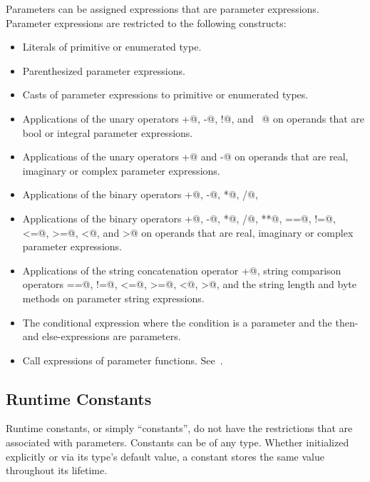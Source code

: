 Parameters can be assigned expressions that are parameter expressions.
Parameter expressions are restricted to the following constructs:
\begin{itemize}
\item
 Literals of primitive or enumerated type.
\item
 Parenthesized parameter expressions.
\item
 Casts of parameter expressions to primitive or enumerated types.
\item
 Applications of the unary operators \verb@+@, \verb@-@, \verb@!@,
 and \verb@~@ on operands that are bool or integral parameter
 expressions.
\item
 Applications of the unary operators \verb@+@ and \verb@-@ on operands that are
 real, imaginary or complex parameter
 expressions.
\item
 Applications of the binary operators \verb@+@, \verb@-@, \verb@*@, \verb@/@, \verb@%@, \verb@**@, \verb@&&@, \verb@||@, \verb@&@, \verb@|@, \verb@^@, \verb@<<@, \verb@>>@, \verb@==@, \verb@!=@, \verb@<=@, \verb@>=@, \verb@<@, and \verb@>@ on operands that are bool or integral parameter expressions.
\item
 Applications of the binary
 operators \verb@+@, \verb@-@, \verb@*@, \verb@/@, \verb@**@, \verb@==@, \verb@!=@, \verb@<=@, \verb@>=@, \verb@<@,
 and \verb@>@ on operands that are real, imaginary or complex parameter expressions.
\item
 Applications of the string concatenation operator \verb@+@, string comparison operators \verb@==@, \verb@!=@, \verb@<=@, \verb@>=@, \verb@<@, \verb@>@, and the string length and byte methods on parameter string expressions.
\item
 The conditional expression where the condition is a parameter and the
 then- and else-expressions are parameters.
\item
 Call expressions of parameter functions.  See~.
\end{itemize}

\subsection{Runtime Constants}
\label{Runtime_Constants}

Runtime constants, or simply ``constants'', do not have the
restrictions that are associated with parameters.  Constants can be of
any type.  Whether initialized explicitly or via its type's default
value, a constant stores the same value throughout its lifetime.

